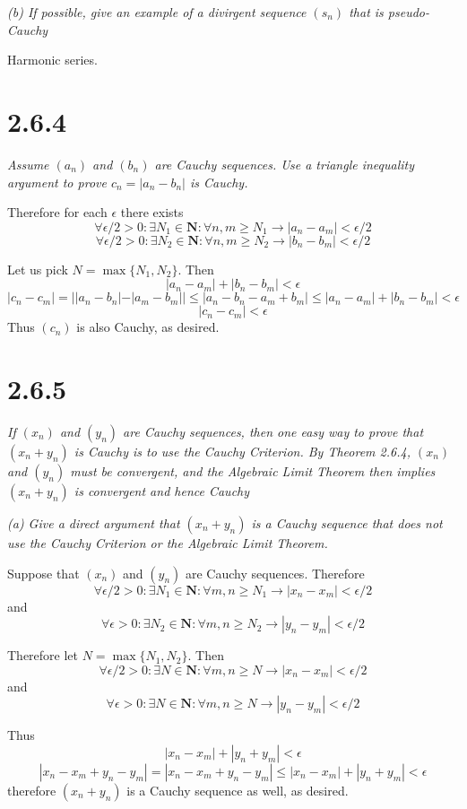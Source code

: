 \documentclass[11pt,oneside,titlepage]{article}
\begin{document}
\textit{(b) If possible, give an example of a divirgent sequence $(s_n)$ that
  is pseudo-Cauchy}

Harmonic series.

\section*{2.6.4}
\textit{Assume $(a_n)$ and $(b_n)$ are Cauchy sequences. Use a triangle
  inequality argument to prove $c_n = |a_n - b_n|$ is Cauchy.}

Therefore for each $\epsilon$ there exists
$$\forall \epsilon/2 > 0: \exists N_1 \in \textbf{N}: \forall n,m \geq N_1 \to
|a_n - a_m| < \epsilon/2$$
$$\forall \epsilon/2 > 0: \exists N_2 \in \textbf{N}: \forall n,m \geq N_2 \to
|b_n - b_m| < \epsilon/2$$

Let us pick $N = \max\{N_1, N_2\}$. Then
$$|a_n - a_m| + |b_n - b_m| < \epsilon$$
$$|c_n - c_m| = ||a_n - b_n| - |a_m - b_m|| \leq |a_n - b_n - a_m + b_m|
\leq |a_n - a_m| + |b_n - b_m| < \epsilon$$
$$|c_n - c_m|  < \epsilon$$
Thus $(c_n)$ is also Cauchy, as desired.

\section*{2.6.5}
\textit{If $(x_n)$ and $(y_n)$ are Cauchy sequences, then one easy way to
  prove that $(x_n + y_n)$ is Cauchy is to use the Cauchy Criterion. By
  Theorem 2.6.4, $(x_n)$ and $(y_n)$ must be convergent, and the Algebraic
  Limit Theorem then implies $(x_n + y_n)$ is convergent and hence Cauchy}

\textit{(a) Give a direct argument that $(x_n + y_n)$ is a Cauchy
  sequence that does not use the Cauchy Criterion or the Algebraic Limit
  Theorem.}

Suppose that $(x_n)$ and $(y_n)$ are Cauchy sequences. Therefore
$$\forall \epsilon/2 > 0: \exists N_1 \in \textbf{N}: \forall m,n \geq N_1 \to
|x_n - x_m| < \epsilon/2$$
and
$$\forall \epsilon > 0: \exists N_2 \in \textbf{N}: \forall m,n \geq N_2 \to
|y_n - y_m| < \epsilon/2$$

Therefore let $N = \max\{N_1, N_2\}$. Then
$$\forall \epsilon/2 > 0: \exists N \in \textbf{N}: \forall m,n \geq N \to
|x_n - x_m| < \epsilon/2$$
and
$$\forall \epsilon > 0: \exists N \in \textbf{N}: \forall m,n \geq N \to
|y_n - y_m| < \epsilon/2$$

Thus
$$|x_n - x_m| + |y_n + y_m| < \epsilon$$
$$|x_n - x_m + y_n - y_m | = |x_n - x_m + y_n - y_m| \leq |x_n - x_m| + |y_n + y_m| < \epsilon$$
therefore $(x_n + y_n)$ is a Cauchy sequence as well, as desired.
\end{document}
